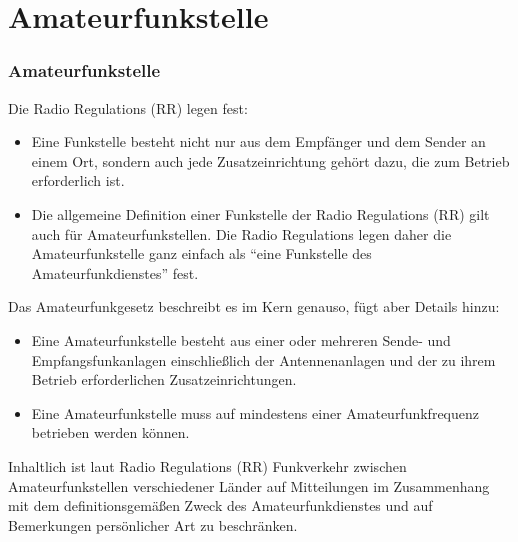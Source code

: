 
\section{Amateurfunkstelle}
\label{section:amateurfunkstelle}
\begin{frame}%

\frametitle{Amateurfunkstelle}
Die Radio Regulations (RR) legen fest:

\begin{itemize}
  \item Eine Funkstelle besteht nicht nur aus dem Empfänger und dem Sender an einem Ort, sondern auch jede Zusatzeinrichtung gehört dazu, die zum Betrieb erforderlich ist.
  \item Die allgemeine Definition einer Funkstelle der Radio Regulations (RR) gilt auch für Amateurfunkstellen. Die Radio Regulations legen daher die Amateurfunkstelle ganz einfach als \enquote{eine Funkstelle des Amateurfunkdienstes} fest.
  \end{itemize}
\end{frame}

\begin{frame}Das Amateurfunkgesetz beschreibt es im Kern genauso, fügt aber Details hinzu:

\begin{itemize}
  \item Eine Amateurfunkstelle besteht aus einer oder mehreren Sende- und Empfangsfunkanlagen einschließlich der Antennenanlagen und der zu ihrem Betrieb erforderlichen Zusatzeinrichtungen.
  \item Eine Amateurfunkstelle muss auf mindestens einer Amateurfunkfrequenz betrieben werden können.
  \end{itemize}
\end{frame}

\begin{frame}Inhaltlich ist laut Radio Regulations (RR) Funkverkehr zwischen Amateurfunkstellen verschiedener Länder auf Mitteilungen im Zusammenhang mit dem definitionsgemäßen Zweck des Amateurfunkdienstes und auf Bemerkungen persönlicher Art zu beschränken.

\end{frame}


